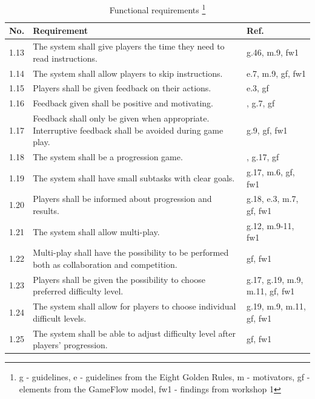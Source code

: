 \begin{minipage}{12 cm}
\begin{table} [H]
\centering
\begin{tabular}{|>{\raggedright}p{}|p{}|p{}|}
\hline
\textbf{No.} & \textbf{Requirement} & \textbf{Ref.} \\ \hline
1.13 & The system shall give players the time they need to read instructions. & g.46, m.9, fw1 \\ \hline 
1.14 & The system shall allow players to skip instructions. & e.7, m.9, gf, fw1 \\ \hline 
1.15 & Players shall be given feedback on their actions. &  e.3, gf \\ \hline
1.16 & Feedback given shall be positive and motivating. & \cite{project}, g.7, gf \\ \hline
1.17 & Feedback shall only be given when appropriate. Interruptive feedback shall be avoided during game play. & g.9, gf, fw1 \\ \hline
1.18 & The system shall be a progression game. & \cite{understandingvg}, g.17, gf \\ \hline
1.19 & The system shall have small subtasks with clear goals. & g.17, m.6, gf, fw1\\ \hline
1.20 & Players shall be informed about progression and results. & g.18, e.3, m.7, gf, fw1 \\ \hline
1.21 & The system shall allow multi-play. & g.12, m.9-11, fw1 \\ \hline
1.22 & Multi-play shall have the possibility to be performed both as collaboration and competition. & gf, fw1\\ \hline
1.23 & Players shall be given the possibility to choose preferred difficulty level. & g.17, g.19, m.9, m.11, gf, fw1\\ \hline
1.24 & The system shall allow for players to choose individual difficult levels. & g.19, m.9, m.11, gf, fw1\\ \hline
1.25 & The system shall be able to adjust difficulty level after players' progression. & gf, fw1 \\ \hline
    \end{tabular}
    \caption[Functional requirements, part 2]{Functional requirements \footnote{g - guidelines, e - guidelines from the Eight Golden Rules, m - motivators, gf - elements from the GameFlow model, fw1 - findings from workshop 1}}
    \label{tab:func2}
\end{table} 
\end{minipage}


